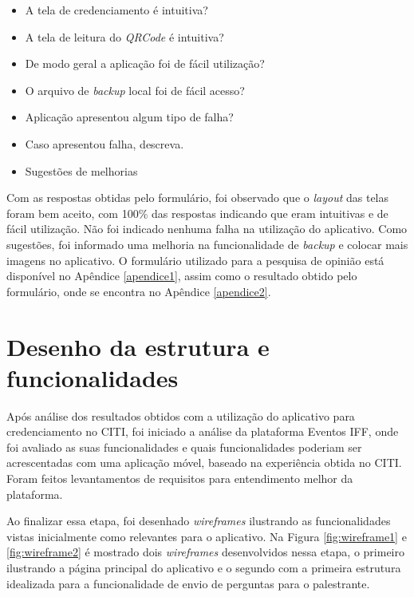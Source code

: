 \begin{itemize}
    \item A tela de credenciamento é intuitiva?
    \item A tela de leitura do \textit{QRCode} é intuitiva?
    \item De modo geral a aplicação foi de fácil utilização?
    \item O arquivo de \textit{backup} local foi de fácil acesso?
    \item Aplicação apresentou algum tipo de falha?
    \item Caso apresentou falha, descreva.
    \item Sugestões de melhorias
\end{itemize}

Com as respostas obtidas pelo formulário, foi observado que o \textit{layout} das telas foram bem aceito, com 100\% das respostas indicando que eram intuitivas e de fácil utilização. Não foi indicado nenhuma falha na utilização do aplicativo. Como sugestões, foi informado uma melhoria na funcionalidade de \textit{backup} e colocar mais imagens no aplicativo. O formulário utilizado para a pesquisa de opinião está disponível no Apêndice \ref{apendice1}, assim como o resultado obtido pelo formulário, onde se encontra no Apêndice \ref{apendice2}.

\section{Desenho da estrutura e funcionalidades}

Após análise dos resultados obtidos com a utilização do aplicativo para credenciamento no CITI, foi iniciado a análise da plataforma Eventos IFF, onde foi avaliado as suas funcionalidades e quais funcionalidades poderiam ser acrescentadas com uma aplicação móvel, baseado na experiência obtida no CITI. Foram feitos levantamentos de requisitos para entendimento melhor da plataforma. 

Ao finalizar essa etapa, foi desenhado \textit{wireframes} ilustrando as funcionalidades vistas inicialmente como relevantes para o aplicativo. Na Figura \ref{fig:wireframe1} e \ref{fig:wireframe2} é mostrado dois \textit{wireframes} desenvolvidos nessa etapa, o primeiro ilustrando a página principal do aplicativo e o segundo com a primeira estrutura idealizada para a funcionalidade de envio de perguntas para o palestrante.


